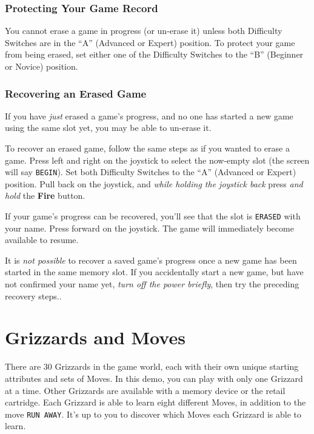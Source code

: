 \documentclass[9pt,twocolumn,openany,article]{memoir}
\begin{document}
\subsection{Protecting Your Game Record}

You  cannot erase  a  game  in progress  (or  un-erase  it) unless  both
Difficulty  Switches are  in the  ``A'' (Advanced  or Expert)  position.
To protect your game from being erased, set either one of the Difficulty
Switches to the ``B'' (Beginner or Novice) position.

\ifdefined\DEMO\else

\subsection{Recovering an Erased Game}

If you have \emph{just} erased a game's progress, and no one has started
a new game using the same slot yet, you may be able to un-erase it.

To recover  an erased game,  follow the same steps  as if you  wanted to
erase  a game.  Press  left and  right  on the  joystick  to select  the
now-empty slot (the screen will say \texttt{BEGIN}). Set both Difficulty
Switches to  the ``A'' (Advanced or  Expert) position. Pull back  on the
joystick,  and \emph{while  holding the  joystick back}  press \emph{and
  hold} the \textbf{Fire} button.

If your  game's progress can be  recovered, you'll see that  the slot is
\texttt{ERASED} with your name. Press  forward on the joystick. The game
will immediately become available to resume.

It is \emph{not possible} to recover  a saved game's progress once a new
game has been started in the same memory slot. If you accidentally start
a new  game, but have  not confirmed your  name yet, \emph{turn  off the
  power briefly}, then try the preceding recovery steps..

\fi

\fi %

\chapter{Grizzards and Moves}\label{ch:Grizzards}

There are  30 Grizzards in  the game world,  each with their  own unique
starting attributes and  sets of Moves. \ifdefined\NOSAVE  In this demo,
you  can play  with only  one Grizzard  at a  time. Other  Grizzards are
available  with  a memory  device  or  the  retail cartridge.  \fi  Each
Grizzard is able to learn eight different Moves, in addition to the move
\texttt{RUN AWAY}. It's up to you  to discover which Moves each Grizzard
is able to learn.
\end{document}
